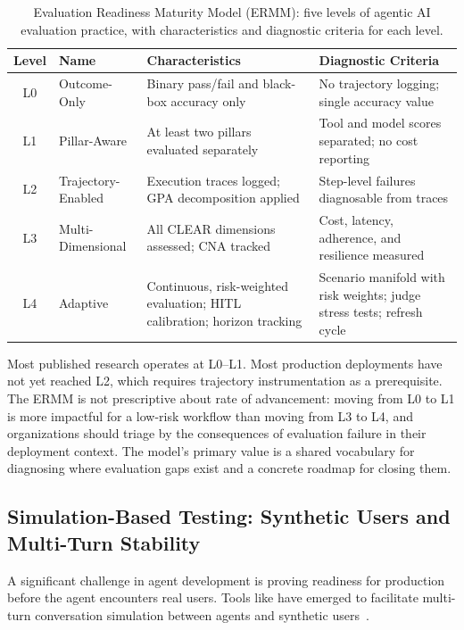 \begin{table}[htbp]
\centering
\caption{Evaluation Readiness Maturity Model (ERMM): five levels of agentic AI evaluation practice, with characteristics and diagnostic criteria for each level.}
\label{tab:ermm}
\fontsize{6}{6.8}\selectfont
\setlength{\tabcolsep}{2.5pt}
\renewcommand{\arraystretch}{0.92}
\begin{tabularx}{1 \columnwidth}{@{}c l >{\raggedright\arraybackslash}X >{\raggedright\arraybackslash}X@{}}
\toprule
\textbf{Level} & \textbf{Name} & \textbf{Characteristics} & \textbf{Diagnostic Criteria} \\
\midrule
L0 & Outcome-Only & Binary pass/fail and black-box accuracy only & No trajectory logging; single accuracy value \\
L1 & Pillar-Aware & At least two pillars evaluated separately & Tool and model scores separated; no cost reporting \\
L2 & Trajectory-Enabled & Execution traces logged; GPA decomposition applied & Step-level failures diagnosable from traces \\
L3 & Multi-Dimensional & All CLEAR dimensions assessed; CNA tracked & Cost, latency, adherence, and resilience measured \\
L4 & Adaptive & Continuous, risk-weighted evaluation; HITL calibration; horizon tracking & Scenario manifold with risk weights; judge stress tests; refresh cycle \\
\bottomrule
\end{tabularx}
\renewcommand{\arraystretch}{1}
\end{table}

Most published research operates at L0--L1. Most production deployments have not yet reached L2, which requires trajectory instrumentation as a prerequisite. The ERMM is not prescriptive about rate of advancement: moving from L0 to L1 is more impactful for a low-risk workflow than moving from L3 to L4, and organizations should triage by the consequences of evaluation failure in their deployment context. The model's primary value is a shared vocabulary for diagnosing where evaluation gaps exist and a concrete roadmap for closing them.

\subsection{Simulation-Based Testing: Synthetic Users and Multi-Turn Stability}

A significant challenge in agent development is proving readiness for production before the agent encounters real users. Tools like  have emerged to facilitate multi-turn conversation simulation between agents and synthetic users~\citep{arksim_primary}.

